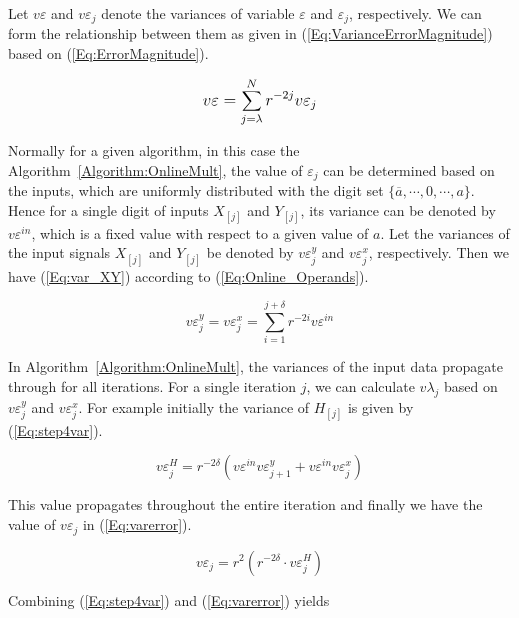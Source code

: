 \documentclass[journal]{IEEEtran}
\begin{document}
Let $v\varepsilon$ and $v\varepsilon_j$ denote the variances of variable $\varepsilon$ and $\varepsilon_j$, respectively. We can form the relationship between them as given in (\ref{Eq:VarianceErrorMagnitude}) based on (\ref{Eq:ErrorMagnitude}).

\begin{eqnarray}\label{Eq:VarianceErrorMagnitude}
\scriptsize
	v\varepsilon=\sum_{j=\lambda}^{N} r^{-2j}v\varepsilon_j
\normalsize
\end{eqnarray}

Normally for a given algorithm, in this case the Algorithm~\ref{Algorithm:OnlineMult}, the value of $\varepsilon_j$ can be determined based on the inputs, which are uniformly distributed with the digit set $\{\overline{a},\cdots,0,\cdots,a\}$. Hence for a single digit of inputs $X_{[j]}$ and $Y_{[j]}$, its variance can be denoted by $v\varepsilon^{in}$, which is a fixed value with respect to a given value of $a$. Let the variances of the input signals $X_{[j]}$ and $Y_{[j]}$ be denoted by $v\varepsilon^y_j $ and $ v\varepsilon^x_j$, respectively. Then we have (\ref{Eq:var_XY}) according to (\ref{Eq:Online_Operands}).

\begin{equation}\label{Eq:var_XY}
{v\varepsilon}^y_j = {v\varepsilon}^x_j =\sum_{i=1}^{j+\delta} r^{-2i} v\varepsilon^{in}
\end{equation}

In Algorithm~\ref{Algorithm:OnlineMult}, the variances of the input data propagate through for all iterations. For a single iteration $j$, we can calculate $v\lambda_j$ based on $v\varepsilon^y_j $ and $ v\varepsilon^x_j$. For example initially the variance of $H_{[j]}$ is given by (\ref{Eq:step4var}). 

\begin{equation}\label{Eq:step4var}
{v\varepsilon}^H_j =r^{-2\delta}(v\varepsilon^{in}  v\varepsilon^y_{j+1} +v\varepsilon^{in}  v\varepsilon^x_j) 
\end{equation}

This value propagates throughout the entire iteration and finally we have the value of $v\varepsilon_j$ in (\ref{Eq:varerror}).

\begin{equation}\label{Eq:varerror}
v\varepsilon_j=r^2 \left( r^{-2\delta}\cdot {v\varepsilon}^H_j \right)
\end{equation}

Combining (\ref{Eq:step4var}) and (\ref{Eq:varerror}) yields 
\end{document}
